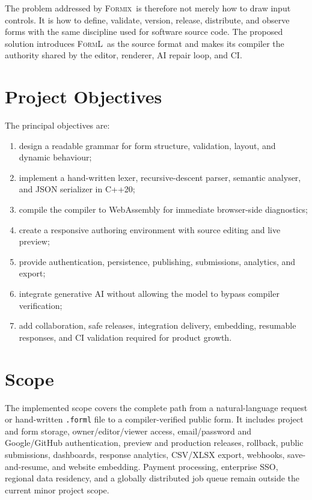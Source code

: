 \documentclass[12pt,a4paper,oneside]{report}
\newcommand{\formix}{\textsc{Formix}}
\newcommand{\forml}{\textsc{FormL}}
\begin{document}
The problem addressed by \formix\ is therefore not merely how to draw input controls. It is
how to define, validate, version, release, distribute, and observe forms with the same discipline
used for software source code. The proposed solution introduces \forml\ as the source format
and makes its compiler the authority shared by the editor, renderer, AI repair loop, and CI.

\section{Project Objectives}
The principal objectives are:
\begin{enumerate}
  \item design a readable grammar for form structure, validation, layout, and dynamic behaviour;
  \item implement a hand-written lexer, recursive-descent parser, semantic analyser, and JSON serializer in C++20;
  \item compile the compiler to WebAssembly for immediate browser-side diagnostics;
  \item create a responsive authoring environment with source editing and live preview;
  \item provide authentication, persistence, publishing, submissions, analytics, and export;
  \item integrate generative AI without allowing the model to bypass compiler verification;
  \item add collaboration, safe releases, integration delivery, embedding, resumable responses, and CI validation required for product growth.
\end{enumerate}

\section{Scope}
The implemented scope covers the complete path from a natural-language request or hand-written
\texttt{.forml} file to a compiler-verified public form. It includes project and form storage,
owner/editor/viewer access, email/password and Google/GitHub authentication, preview and
production releases, rollback, public submissions, dashboards, response analytics, CSV/XLSX
export, webhooks, save-and-resume, and website embedding. Payment processing, enterprise SSO,
regional data residency, and a globally distributed job queue remain outside the current minor
project scope.
\end{document}
